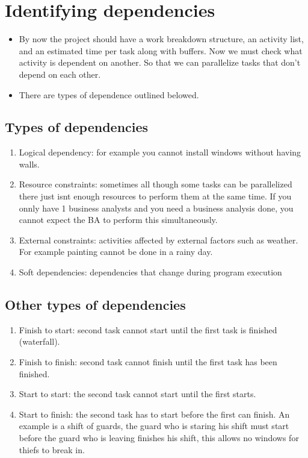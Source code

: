 \section{Identifying dependencies}
\begin{itemize}
    \item By now the project should have a work breakdown structure, an activity list, and an estimated time per task along with buffers. Now we must check what activity is dependent on another. So that we can parallelize tasks that don't depend on each other.
    \item There are types of dependence outlined belowed.
\end{itemize}

\subsection{Types of dependencies}
\begin{enumerate}
    \item Logical dependency: for example you cannot install windows without having walls.
    \item Resource constraints: sometimes all though some tasks can be parallelized there just isnt enough resources to perform them at the same time. If you onnly have 1 business analysts and you need a business analysis done, you cannot expect the BA to perform this simultaneously.
    \item External constraints: activities affected by external factors such as weather. For example painting cannot be done in a rainy day.
    \item Soft dependencies: dependencies that change during program execution
\end{enumerate}

\subsection{Other types of dependencies}
\begin{enumerate}
    \item Finish to start: second task cannot start until the first task is finished (waterfall).
    \item Finish to finish: second task cannot finish until the first task has been finished.
    \item Start to start: the second task cannot start until the first starts.
    \item Start to finish: the second task has to start before the first can finish. An example is a shift of guards, the guard who is staring his shift must start before the guard who is leaving finishes his shift, this allows no windows for thiefs to break in.
\end{enumerate}

